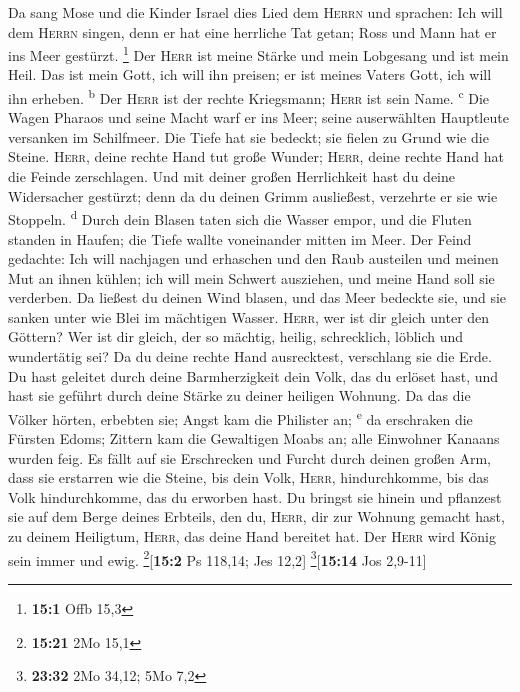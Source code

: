  Da sang Mose und die Kinder Israel dies Lied dem
\textsc{Herrn} und sprachen: Ich will dem \textsc{Herrn} singen, denn er
hat eine herrliche Tat getan; Ross und Mann hat er ins Meer gestürzt.
\footnote{\textbf{15:1} Offb 15,3}  Der \textsc{Herr} ist
meine Stärke und mein Lobgesang und ist mein Heil. Das ist mein Gott,
ich will ihn preisen; er ist meines Vaters Gott, ich will ihn erheben.
\textsuperscript{b}  Der \textsc{Herr} ist der rechte
Kriegsmann; \textsc{Herr} ist sein Name. \textsuperscript{c}
 Die Wagen Pharaos und seine Macht warf er ins Meer; seine
auserwählten Hauptleute versanken im Schilfmeer.  Die
Tiefe hat sie bedeckt; sie fielen zu Grund wie die Steine.
 \textsc{Herr}, deine rechte Hand tut große Wunder;
\textsc{Herr}, deine rechte Hand hat die Feinde zerschlagen.
 Und mit deiner großen Herrlichkeit hast du deine
Widersacher gestürzt; denn da du deinen Grimm ausließest, verzehrte er
sie wie Stoppeln. \textsuperscript{d}  Durch dein Blasen
taten sich die Wasser empor, und die Fluten standen in Haufen; die Tiefe
wallte voneinander mitten im Meer.  Der Feind gedachte:
Ich will nachjagen und erhaschen und den Raub austeilen und meinen Mut
an ihnen kühlen; ich will mein Schwert ausziehen, und meine Hand soll
sie verderben.  Da ließest du deinen Wind blasen, und das
Meer bedeckte sie, und sie sanken unter wie Blei im mächtigen Wasser.
 \textsc{Herr}, wer ist dir gleich unter den Göttern? Wer
ist dir gleich, der so mächtig, heilig, schrecklich, löblich und
wundertätig sei?  Da du deine rechte Hand ausrecktest,
verschlang sie die Erde.  Du hast geleitet durch deine
Barmherzigkeit dein Volk, das du erlöset hast, und hast sie geführt
durch deine Stärke zu deiner heiligen Wohnung.  Da das
die Völker hörten, erbebten sie; Angst kam die Philister an;
\textsuperscript{e}  da erschraken die Fürsten Edoms;
Zittern kam die Gewaltigen Moabs an; alle Einwohner Kanaans wurden feig.
 Es fällt auf sie Erschrecken und Furcht durch deinen
großen Arm, dass sie erstarren wie die Steine, bis dein Volk,
\textsc{Herr}, hindurchkomme, bis das Volk hindurchkomme, das du
erworben hast.  Du bringst sie hinein und pflanzest sie
auf dem Berge deines Erbteils, den du, \textsc{Herr}, dir zur Wohnung
gemacht hast, zu deinem Heiligtum, \textsc{Herr}, das deine Hand
bereitet hat.  Der \textsc{Herr} wird König sein immer
und ewig. \footnote{\textbf{15:21} 2Mo 15,1}{[}\textbf{15:2} Ps 118,14;
Jes 12,2{]} \footnote{\textbf{23:32} 2Mo 34,12; 5Mo 7,2}{[}\textbf{15:14}
Jos 2,9-11{]}

